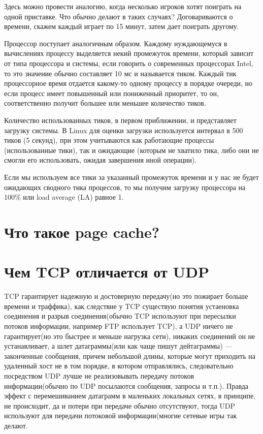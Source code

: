 Здесь можно провести аналогию, когда несколько игроков хотят поиграть на одной приставке. Что обычно делают в таких случаях? Договариваются о времени, скажем каждый играет по 15 минут, затем дает поиграть другому.

Процессор поступает аналогичным образом. Каждому нуждающемуся в вычислениях процессу выделяется некий промежуток времени, который зависит от типа процессора и системы, если говорить о современных процессорах Intel, то это значение обычно составляет 10 мс и называется тиком. Каждый тик процессорное время отдается какому-то одному процессу в порядке очереди, но если процесс имеет повышенный или пониженный приоритет, то он, соответственно получит большее или меньшее количество тиков.

Количество использованных тиков, в первом приближении, и представляет загрузку системы. В Linux для оценки загрузки используется интервал в 500 тиков (5 секунд), при этом учитываются как работающие процессы (использованные тики), так и ожидающие (которым не хватило тика, либо они не смогли его использовать, ожидая завершения иной операции).

Если мы используем все тики за указанный промежуток времени и у нас не будет ожидающих сводного тика процессов, то мы получим загрузку процессора на 100\% или load average (LA) равное 1.

\section{Что такое page cache?}

\section{Чем TCP отличается от UDP}

TCP гарантирует надежную и достоверную передачу(но это пожирает больше времени и траффика), как следствие у TCP существую понятия устаеновка соединения и разрыв соединения(обычно TCP используют при пересылки потоков информации, например FTP использует TCP), а UDP ничего не гарантирует(но это быстрее и меньше нагрузка сети), никаких соединений он не устанавливает, а шлет датаграммы(или как чаще пишут дейтаграммы) — законченные сообщения, причем небольшой длины, которые могут приходить на удаленный хост не в том порядке, в котором отправлялись, следовательно посредством UDP лучше не реализовывать передачу потоков информации(обычно по UDP посылаются сообщения, запросы и т.п.). Правда эффект с перемешиванием датаграмм в маленьких локальных сетях, в принципе, не происходит, да и потери при передаче обычно отсутствуют, тогда UDP используют для передачи потоковой информации(многие сетевые игры так делают.

